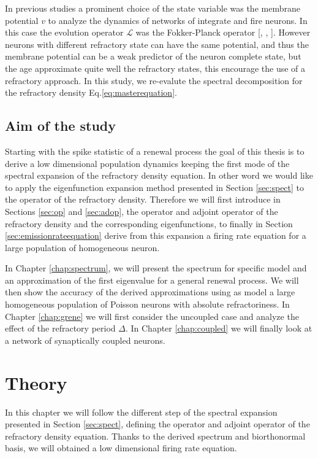 \documentclass[12pt,twoside]{report}
\begin{document}
 In previous studies a prominent choice of the state variable was the membrane potential $v$  to analyze the dynamics of networks of integrate and fire neurons.  In this case the evolution operator $\mathcal{L}$ was the Fokker-Planck operator [\cite{MatGiu02}, \cite{GerKis02}, \cite{SchOst13}]. However neurons with different refractory state can have the same potential, and thus the membrane potential can be a weak predictor of the neuron complete state, but the age approximate quite well the refractory states, this encourage the use of a refractory approach. In this study, we re-evalute the spectral decomposition for the refractory density Eq.\eqref{eq:masterequation}. 


\section{Aim of the study}

Starting with the spike statistic of a renewal process the goal of this thesis is to derive a low dimensional population dynamics keeping the first mode of the spectral expansion of the refractory density equation. In other word we would like to apply the eigenfunction expansion method presented in Section \ref{sec:spect} to the operator of the refractory density. Therefore we will first introduce in Sections \ref{sec:op} and \ref{sec:adop}, the operator and adjoint operator of the refractory density and the corresponding eigenfunctions, to finally  in Section \ref{sec:emissionrateequation} derive from this expansion a firing rate equation for a large population of homogeneous neuron. 

In Chapter \ref{chap:spectrum}, we will present the spectrum for specific model and an approximation of the first eigenvalue for a general renewal process. We will then show the accuracy of the derived approximations using as model a large homogeneous population of Poisson neurons with absolute refractoriness.
In Chapter \ref{chap:grene} we will first consider the uncoupled case and analyze the effect of the refractory period $\Delta$. In Chapter \ref{chap:coupled} we will finally look at a network of synaptically coupled neurons.



\chapter{Theory}
\label{chap:theory}

In this chapter we will follow the different step of the spectral expansion presented in Section \ref{sec:spect}, defining the operator and adjoint operator of the refractory density equation. Thanks to the derived  spectrum and biorthonormal basis, we will obtained a low dimensional firing rate equation.
\end{document}
